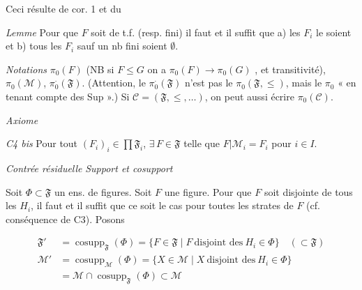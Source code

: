 \documentclass[11pt,a4paper]{article}
\begin{document}
Ceci résulte de  cor. 1 et du

\emph{Lemme} \quad Pour que $F$ soit de t.f. (resp. fini) il faut et il suffit que a) les $F_i$ le soient et b) tous les $F_i$ sauf un nb fini soient $\emptyset$.

\emph{Notations} \quad $\pi_0(F)$ (NB si $F \leq G$ on a $\pi_0(F) \to \pi_0(G)$ \ill{}, et transitivité), $\pi_0(\mathcal{M})$, $\pi_0^{\cdot}(\mathfrak{F})$. (Attention, le $\pi_0^{\cdot}(\mathfrak{F})$ n'est pas le $\pi_0(\mathfrak{F}, \leq)$, mais le $\pi_0$ « en tenant compte des Sup ».) Si $\mathcal{C} = (\mathfrak{F}, \leq, \ldots)$, on peut aussi écrire $\pi_0(\mathcal{C})$.

\emph{Axiome }

\emph{C4 bis} \quad Pour tout $(F_i)_i \in \prod \mathfrak{F}_i$, \struck{\ill{}} $\exists\, F \in \mathfrak{F}$ telle que $F|\mathcal{M}_i = F_i$ pour $i \in I$.

\emph{Contrée résiduelle} \quad \emph{Support et cosupport}

Soit \struck{\ill{}} $\Phi \subset \mathfrak{F}$  un ens. de figures.  Soit $F$ une figure. Pour  que $F$ soit disjointe de tous les $H_i$, il faut et il suffit que ce soit le cas pour toutes les strates de $F$ (cf. conséquence de C3).  Posons

\begin{align*}
  \mathfrak{F}' &= \operatorname{cosupp}_{\mathfrak{F}}(\Phi) = \lbrace F \in \mathfrak{F} \mid F \ \text{disjoint des}\ H_i \in \Phi \rbrace \quad (\subset \mathfrak{F}) \\
  \mathcal{M}' &= \operatorname{cosupp}_{\mathcal{M}}(\Phi) = \lbrace X \in \mathcal{M} \mid X \ \text{disjoint des}\ H_i \in \Phi \rbrace \\
  &= \mathcal{M} \cap \operatorname{cosupp}_{\mathfrak{F}}(\Phi) \subset \mathcal{M}
\end{align*}

 \struck{$\Phi$} 
\end{document}
